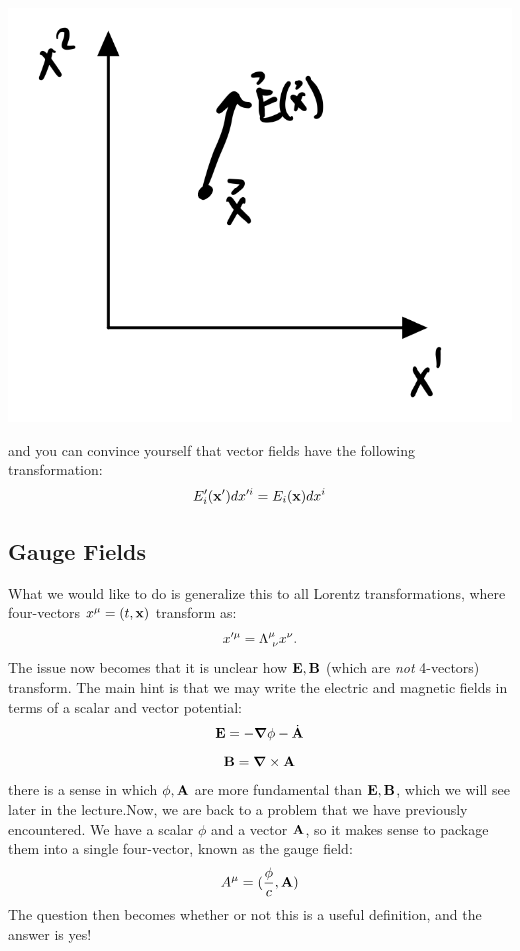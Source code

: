 \begin{center}
    \includegraphics[scale=0.35]{Lectures/Images/lec4-vectorfield.png}
\end{center}

and you can convince yourself that vector fields have the following transformation:
\begin{equation}
    E'_i(\mathbf{x}')dx'^i = E_i(\mathbf{x})dx^i
\end{equation}

\subsection{Gauge Fields}

What we would like to do is generalize this to all Lorentz transformations, where four-vectors $x^\mu = (t, \mathbf{x})$ transform as:
\begin{equation}\label{eq:spacetimecoordLorentztransformation}
    x'^\mu = \Lambda^{\mu}_{\sp\nu}x^\nu.
\end{equation}
The issue now becomes that it is unclear how $\mathbf{E}, \mathbf{B}$ (which are \emph{not} 4-vectors) transform. The main hint is that we may write the electric and magnetic fields in terms of a scalar and vector potential:
\begin{equation}
    \v{E} = -\nabla \phi - \dot{\v{A}}
\end{equation}
\begin{equation}
    \v{B} = \nabla \times\v{A}
\end{equation}
there is a sense in which $\phi, \mathbf{A}$ are more fundamental than $\mathbf{E}, \mathbf{B}$, which we will see later in the lecture.Now, we are back to a problem that we have previously encountered. We have a scalar $\phi$ and a vector $\mathbf{A}$, so it makes sense to package them into a single four-vector, known as the gauge field:
\begin{equation}
    A^\mu = (\frac{\phi}{c}, \mathbf{A})
\end{equation}
The question then becomes whether or not this is a useful definition, and the answer is yes! 

